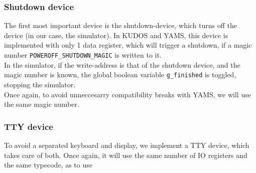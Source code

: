 \subsubsection{Shutdown device}
The first most important device is the shutdown-device, which turns off the
device (in our case, the simulator).
In KUDOS and YAMS, this device is implemented with only 1 data register, which
will trigger a shutdown, if a magic number \texttt{POWEROFF\_SHUTDOWN\_MAGIC} is
written to it\cite[drivers/metadev.h]{kudos}.\\
In the simulator, if the write-address is that of the shutdown device, and the
magic number is known, the global boolean variable \texttt{g\_finished} is
toggled, stopping the simulator.\\
Once again, to avoid unneccesarry compatibility breaks with YAMS, we will use
the same magic number.

\subsubsection{TTY device}
To avoid a separated keyboard and display, we implement a TTY device, which
takes care of both. Once again, it will use the same number of IO registers
and the same typecode, as to use
